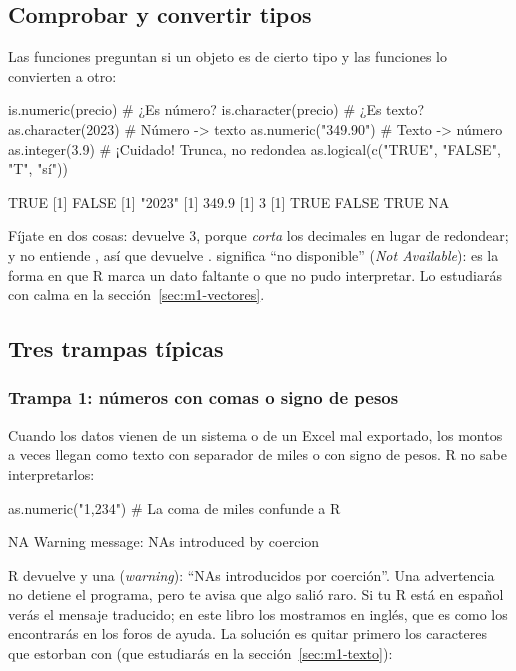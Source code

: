 \subsection{Comprobar y convertir tipos}

Las funciones  preguntan si un objeto es de cierto tipo y las
funciones  lo convierten a otro:

\begin{rcode}
is.numeric(precio)             # ¿Es número?
is.character(precio)           # ¿Es texto?
as.character(2023)             # Número -> texto
as.numeric("349.90")           # Texto -> número
as.integer(3.9)                # ¡Cuidado! Trunca, no redondea
as.logical(c("TRUE", "FALSE", "T", "sí"))
\end{rcode}
\begin{rsalida}
[1] TRUE
[1] FALSE
[1] "2023"
[1] 349.9
[1] 3
[1]  TRUE FALSE  TRUE    NA
\end{rsalida}

Fíjate en dos cosas:  devuelve 3, porque
\emph{corta} los decimales en lugar de redondear; y 
no entiende , así que devuelve . 
significa ``no disponible'' (\emph{Not Available}): es la forma en que R
marca un dato faltante o que no pudo interpretar. Lo estudiarás con calma
en la sección~\ref{sec:m1-vectores}.

\subsection{Tres trampas típicas}

\subsubsection{Trampa 1: números con comas o signo de pesos}

Cuando los datos vienen de un sistema o de un Excel mal exportado, los
montos a veces llegan como texto con separador de miles o con signo de
pesos. R no sabe interpretarlos:

\begin{rnoejecutar}
as.numeric("1,234")            # La coma de miles confunde a R
\end{rnoejecutar}
\begin{rsalida}
[1] NA
Warning message:
NAs introduced by coercion 
\end{rsalida}

R devuelve  y una  (\emph{warning}):
``NAs introducidos por coerción''. Una advertencia no detiene el programa,
pero te avisa que algo salió raro. Si tu R está en español verás el mensaje
traducido; en este libro los mostramos en inglés, que es como los
encontrarás en los foros de ayuda. La solución es quitar primero los
caracteres que estorban con  (que estudiarás en la
sección~\ref{sec:m1-texto}):


